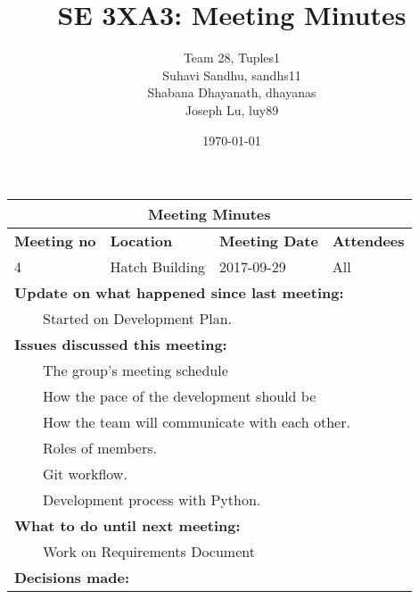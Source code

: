 \documentclass{article}
\title{SE 3XA3: Meeting Minutes}
\author{Team 28, Tuples1
		\\ Suhavi Sandhu, sandhs11
		\\ Shabana Dhayanath, dhayanas
		\\ Joseph Lu, luy89
}
\date{\today}
\newcommand{\tabitem}{~~\llap{\textbullet}~~}
\begin{document}
\begin{tabularx}{\textwidth}{ |X||X||X||X| }
    \hline
    \hline
        \multicolumn{4}{|c|}{\textbf{Meeting Minutes}} \\ 
    \hline
    \hline

    \textbf{Meeting no} & \textbf{Location} & \textbf{Meeting Date} & \textbf{Attendees}\\
    \hline

    4 & Hatch Building & 2017-09-29 & All\\

    \hline

    \multicolumn{4}{|l|}{\textbf{Update on what happened since last meeting: }} \\
		
	\multicolumn{4}{|l|}{\tabitem Started on Development Plan.}\\

    \hline
    
    \multicolumn{4}{|l|}{\textbf{Issues discussed this meeting: }}\\

    \multicolumn{4}{|l|}{\tabitem The group's meeting schedule}\\
    \multicolumn{4}{|l|}{\tabitem How the pace of the development should be}\\ 
    \multicolumn{4}{|l|}{\tabitem How the team will communicate with each other.}\\
    \multicolumn{4}{|l|}{\tabitem Roles of members.}\\
    \multicolumn{4}{|l|}{\tabitem Git workflow.}\\
    \multicolumn{4}{|l|}{\tabitem Development process with Python.}\\
	


    \hline

    \multicolumn{4}{|l|}{\textbf{What to do until next meeting: }} \\

	\multicolumn{4}{|l|}{\tabitem Work on Requirements Document}\\

    \hline
        \multicolumn{4}{|l|}{\textbf{Decisions made: }} \\
    \hline
\end{tabularx}
\end{document}
